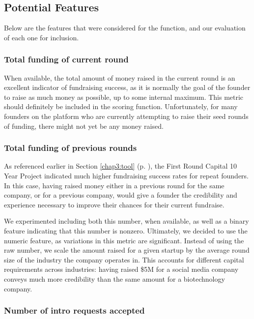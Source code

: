 \subsection{Potential Features}

Below are the features that were considered for the function, and our evaluation of each one for inclusion.

\subsubsection{Total funding of current round}

When available, the total amount of money raised in the current round is an excellent indicator of fundraising success, as it is normally the goal of the founder to raise as much money as possible, up to some internal maximum. This metric should definitely be included in the scoring function. Unfortunately, for many founders on the platform who are currently attempting to raise their seed rounds of funding, there might not yet be any money raised.

\subsubsection{Total funding of previous rounds}

As referenced earlier in Section \ref{chap3:tool} (p. \pageref{chap3:tool}), the First Round Capital 10 Year Project \cite{first-round-10-years} indicated much higher fundraising success rates for repeat founders. In this case, having raised money either in a previous round for the same company, or for a previous company, would give a founder the credibility and experience necessary to improve their chances for their current fundraise.

We experimented including both this number, when available, as well as a binary feature indicating that this number is nonzero. Ultimately, we decided to use the numeric feature, as variations in this metric are significant. Instead of using the raw number, we scale the amount raised for a given startup by the average round size of the industry the company operates in. This accounts for different capital requirements across industries: having raised \$5M for a social media company conveys much more credibility than the same amount for a biotechnology company.

\subsubsection{Number of intro requests accepted}

